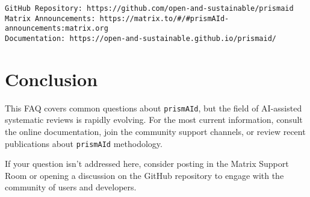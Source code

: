 \begin{infobox}
\begin{lstlisting}
GitHub Repository: https://github.com/open-and-sustainable/prismaid
Matrix Announcements: https://matrix.to/#/#prismAId-announcements:matrix.org
Documentation: https://open-and-sustainable.github.io/prismaid/
\end{lstlisting}
\end{infobox}

\section{Conclusion}

This FAQ covers common questions about \texttt{prismAId}, but the field of AI-assisted systematic reviews is rapidly evolving. For the most current information, consult the online documentation, join the community support channels, or review recent publications about \texttt{prismAId} methodology.

If your question isn't addressed here, consider posting in the Matrix Support Room or opening a discussion on the GitHub repository to engage with the community of users and developers.
